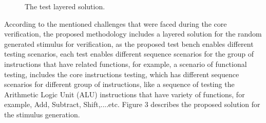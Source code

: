 \documentclass[conference,10 pt,twoside]{IEEEtran}
\begin{document}
\begin{center}
\begin{figure}[h]
\caption{The test layered solution.} 
\label{Figure3:tikzpicture} 
\end{figure}
\end{center}
According to the mentioned challenges that were faced during the core verification, the proposed methodology includes a layered solution for the random generated stimulus for verification, as the proposed test bench enables different testing scenarios, each test enables different sequence scenarios for the group of instructions that have related functions, for example, a scenario of functional testing, includes the core instructions testing, which has different sequence scenarios for different group of instructions, like a sequence of testing the Arithmetic Logic Unit (ALU) instructions that have variety of functions, for example, Add, Subtract, Shift,....etc. Figure 3 describes the proposed solution for the stimulus generation.
\end{document}
